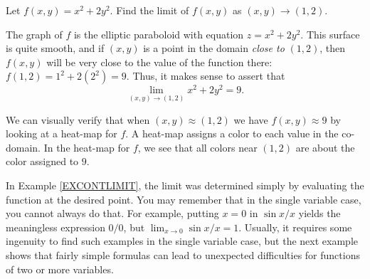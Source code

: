 \begin{example}
	\label{EXCONTLIMIT}
	Let $f(x,y) = x^2 + 2y^2$. Find the limit of $f(x,y)$ as $(x,y)\to(1,2)$.
	
	The graph of $f$ is the elliptic paraboloid
	with equation $z = x^2 + 2y^2$.
	This surface is quite smooth, and if $(x,y)$ is
	a point in the domain \emph{close to} $(1,2)$, then $f(x,y)$
	will be very close to the value of the function there: $f(1,2) =
	1^2 + 2(2^2) = 9$.   Thus, it makes sense to assert that
	\[
	 \lim_{(x,y)\to (1,2)} x^2 + 2y^2 = 9.
	\]

	We can visually verify that when $(x,y)\approx(1,2)$ we have
	$f(x,y)\approx 9$ by looking at a heat-map for $f$.  A heat-map
	assigns a color to each value in the co-domain.  In the heat-map for
	$f$, we see that all colors near $(1,2)$ are about the color assigned to $9$.
	\begin{center}
	\end{center}
\end{example}

In Example \ref{EXCONTLIMIT}, the limit was determined simply by evaluating the
function at the desired point.  You may remember that in the single
variable case, you cannot always do that.
For example, putting $x = 0$ in  $\sin x/x$ yields the meaningless
expression $0/0$, but $\lim_{x \to 0} \sin x/x=1$.
Usually, it requires some ingenuity to find such examples in the single
variable case, but the next example shows that fairly simple formulas
can lead to unexpected difficulties for functions of two or more
variables.

